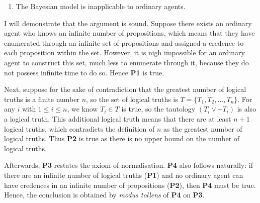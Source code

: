 \documentclass[12pt]{article}
\begin{document}
\begin{enumerate}[resume,label=\textbf{C:}, topsep=0pt, leftmargin=0.5in]
    \item The Bayesian model is inapplicable to ordinary agents.
\end{enumerate}

I will demonstrate that the argument is sound. Suppose there exists an ordinary agent who knows an infinite number of propositions, which means that they have enumerated through an infinite set of propositions and assigned a credence to each proposition within the set. However, it is nigh impossible for an ordinary agent to construct this set, much less to enumerate through it, because they do not possess infinite time to do so. Hence \textbf{P1} is true.

Next, suppose for the sake of contradiction that the greatest number of logical truths is a finite number $n$, so the set of logical truths is $T=\{T_1,T_2,\dots,T_n\}$. For any $i$ with $1\leq i\leq n$, we know $T_i\in T$ is true, so the tautology $(T_i\lor\lnot T_i)$ is also a logical truth. This additional logical truth means that there are at least $n+1$ logical truths, which contradicts the definition of $n$ as the greatest number of logical truths. Thus \textbf{P2} is true as there is no upper bound on the number of logical truths.

Afterwards, \textbf{P3} restates the axiom of normalisation. \textbf{P4} also follows naturally: if there are an infinite number of logical truths (\textbf{P1}) and no ordinary agent can have credences in an infinite number of propositions (\textbf{P2}), then \textbf{P4} must be true. Hence, the conclusion is obtained by \textit{modus tollens} of \textbf{P4} on \textbf{P3}.
\end{document}
